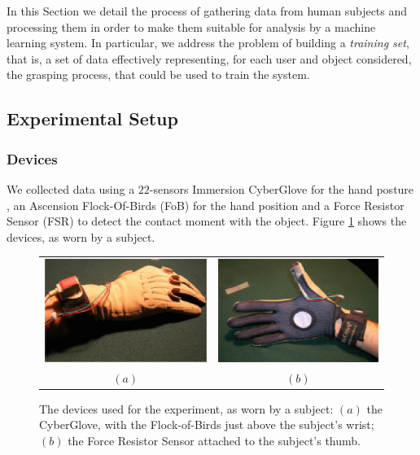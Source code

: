 In this Section we detail the process of gathering data from human
subjects and processing them in order to make them suitable for
analysis by a machine learning system. In particular, we address the
problem of building a \emph{training set}, that is, a set of data
effectively representing, for each user and object considered, the
grasping process, that could be used to train the system.

\subsection{Experimental Setup}

\subsubsection*{Devices}

We collected data using a $22$-sensors Immersion CyberGlove for the
hand posture \cite{cyberglove}, an Ascension Flock-Of-Birds (FoB) for
the hand position \cite{fob} and a Force Resistor Sensor (FSR) to
detect the contact moment with the object. Figure \ref{fig:devices}
shows the devices, as worn by a subject.

\begin{figure}[htbp]
  \begin{center}
    \begin{tabular}{cc}
      \includegraphics[width=0.45\linewidth]{devices1.eps} &
      \includegraphics[width=0.45\linewidth]{devices2.eps} \\
      $(a)$ & $(b)$
    \end{tabular}
    \caption{The devices used for the experiment, as worn by a
    subject: $(a)$ the CyberGlove, with the Flock-of-Birds just above
    the subject's wrist; $(b)$ the Force Resistor Sensor attached to
    the subject's thumb.}
    \label{fig:devices}
  \end{center}
\end{figure}

